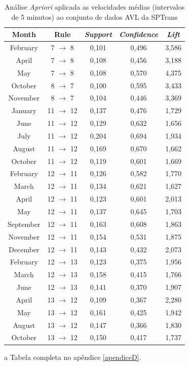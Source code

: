 \documentclass[
	12pt,				%
	oneside,			%
	a4paper,			%
	english,			%
	brazil				%
	]{abntex2ppgsi}
\begin{document}
{{\begin{table}[!htb]
\centering
\begin{threeparttable}
\caption {Análise \textit{Apriori} aplicada as velocidades médias (intervalos de 5 minutos) ao conjunto de dados AVL da SPTrans}
\label {tab:aprioriFull}
\begin{tabular}{c|c|c|c|c}
\hline
\textbf{Month} & \textbf{Rule} & \textit{\textbf{Support}} & \textit{\textbf{Confidence}} & \textit{\textbf{Lift}} \\
\hline
February & 7 $\rightarrow$ 8 & 0,101 & 0,496 & 3,586\\
April & 7 $\rightarrow$ 8  & 0,108 & 0,456 & 3,188\\
May & 7 $\rightarrow$ 8 & 0,108 & 0,570 & 4,375\\
\hline
\hline
October & 8 $\rightarrow$ 7 & 0,100 & 0,595 & 3,433\\
November & 8 $\rightarrow$ 7 & 0,104 & 0,446 & 3,369\\
\hline
\hline
January & 11 $\rightarrow$ 12 & 0,137 & 0,476 & 1,729 \\
June & 11 $\rightarrow$ 12 & 0,129 & 0,632 & 1,656\\
July & 11 $\rightarrow$ 12 & 0,204 & 0,694 & 1,934\\
August & 11 $\rightarrow$ 12 & 0,169 & 0,670 & 1,662\\
October & 11 $\rightarrow$ 12 & 0,119 & 0,601 & 1,669\\
\hline
\hline
February & 12 $\rightarrow$ 11 & 0,126 & 0,582 & 1,770\\
March & 12 $\rightarrow$ 11 & 0,134 & 0,621 & 1,627\\
April & 12 $\rightarrow$ 11 & 0,123 & 0,601 & 2,013\\
May & 12 $\rightarrow$ 11 & 0,137 & 0,645 & 1,703\\
September & 12 $\rightarrow$ 11 & 0,163 & 0,608 & 1,863\\
November & 12 $\rightarrow$ 11 & 0,154 & 0,531 & 1,875\\
December & 12 $\rightarrow$ 11 & 0,143 & 0,432 & 2,073\\
\hline
\hline
February & 12 $\rightarrow$ 13 & 0,123 & 0,375 & 1,956\\
March & 12 $\rightarrow$ 13 & 0,158 & 0,415 & 1,766\\
June & 12 $\rightarrow$ 13 & 0,141 & 0,370 & 1,907\\
\hline
\hline
April  & 13 $\rightarrow$ 12 & 0,109 & 0,367 & 2,280\\
May & 13 $\rightarrow$ 12 & 0,161 & 0,425 & 1,942\\
August & 13 $\rightarrow$ 12 & 0,147 & 0,366 & 1,830\\
October & 13 $\rightarrow$ 12 & 0,150 & 0,417 & 1,737\\
\hline
\end{tabular}
\begin{tablenotes}
            \item[a] Tabela completa no apêndice \ref{apendiceD}.
        \end{tablenotes}
\end{threeparttable}
\end{table}

}}
\end{document}
